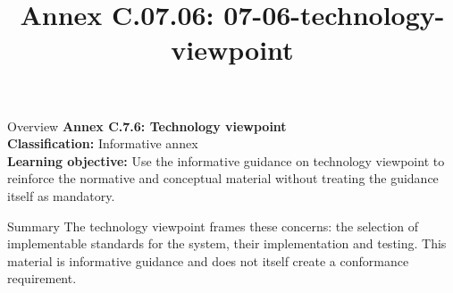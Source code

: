\documentclass[10pt,letterpaper]{article}
\title{Annex C.07.06: 07-06-technology-viewpoint}
\author{}
\date{}
\begin{document}
\maketitle
\begin{CornellOverviewBox}{Overview}
{\Large\bfseries\textcolor{CNavy}{Annex C.7.6: Technology viewpoint}}\\[3pt]
{\small\textbf{Classification:} Informative annex}\\
{\small\textbf{Learning objective:} Use the informative guidance on technology viewpoint to reinforce the normative and conceptual material without treating the guidance itself as mandatory.}
\end{CornellOverviewBox}
\vspace{3pt}

\begin{CornellNotesTable}
\end{CornellNotesTable}


\begin{CornellSummaryBox}{Summary}
The technology viewpoint frames these concerns: the selection of implementable standards for the system, their implementation and testing. This material is informative guidance and does not itself create a conformance requirement.
\end{CornellSummaryBox}
\end{document}
